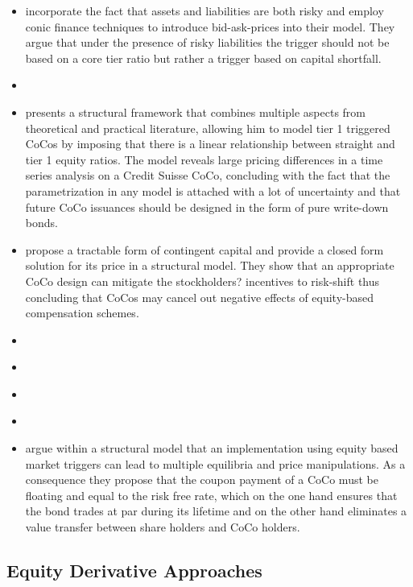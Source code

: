 \begin{itemize}
\item \citet{madan2011conic} incorporate the fact that assets and liabilities are both risky and employ conic finance techniques to introduce bid-ask-prices into their model. They argue that under the presence of risky liabilities the trigger should not be based on a core tier ratio but rather a trigger based on capital shortfall.
\item \citet{alvemar2012modelling}
\item \citet{buergi2013pricing} presents a structural framework that combines multiple aspects from theoretical and practical literature, allowing him to model tier 1 triggered CoCos by imposing that there is a linear relationship between straight and tier 1 equity ratios. The model reveals large pricing differences in a time series analysis on a Credit Suisse CoCo, concluding with the fact that the parametrization in any model is attached with a lot of uncertainty and that future CoCo issuances should be designed in the form of pure write-down bonds.
\item \citet{hilscher2014bank} propose a tractable form of contingent capital and provide a closed form solution for its price in a structural model. They show that an appropriate CoCo design can mitigate the stockholders? incentives to risk-shift thus concluding that CoCos may cancel out negative effects of equity-based compensation schemes.
\item \citet{pennacchi2015reexamination}
\item \citet{turfus2015cocos}
\item \citet{cheridito2015pricing}
\item \citet{erismann2015pricing}
\item \citet{sundaresan2015design} argue within a structural model that an implementation using equity based market triggers can lead to multiple equilibria and price manipulations. As a consequence they propose that the coupon payment of a CoCo must be floating and equal to the risk free rate, which on the one hand ensures that the bond trades at par during its lifetime and on the other hand eliminates a value transfer between share holders and CoCo holders.
\end{itemize}

\subsection*{Equity Derivative Approaches}

